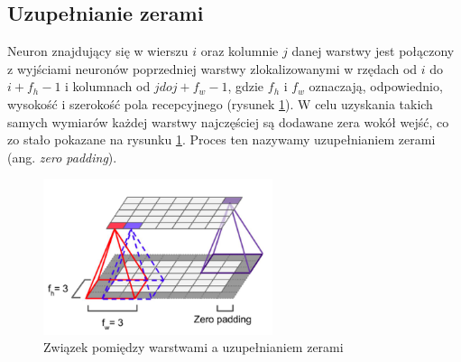 \documentclass{article}
\begin{document}
\subsection{Uzupełnianie zerami}
Neuron znajdujący się w wierszu $i$ oraz kolumnie $j$ danej warstwy jest połączony z wyjściami neuronów poprzedniej warstwy zlokalizowanymi w rzędach od $i$ do $i+f_{h}-1$ i kolumnach od $j do j+f_{w}-1$, gdzie $f_{h}$ i $f_{w}$ oznaczają, odpowiednio, wysokość i szerokość pola recepcyjnego (rysunek \ref{padding}). W celu uzyskania takich samych wymiarów każdej warstwy najczęściej są dodawane zera wokół wejść, co zo stało pokazane na rysunku \ref{padding}. Proces ten nazywamy uzupełnianiem zerami (ang. \textit{zero padding}). \cite{geron}
\begin{figure}[H]
	\centering
	\includegraphics[width=0.6\textwidth,keepaspectratio=true]{padding}
	\caption{Związek pomiędzy warstwami a uzupełnianiem zerami \cite{geron}}
	\label{padding}
\end{figure}

\end{document}
